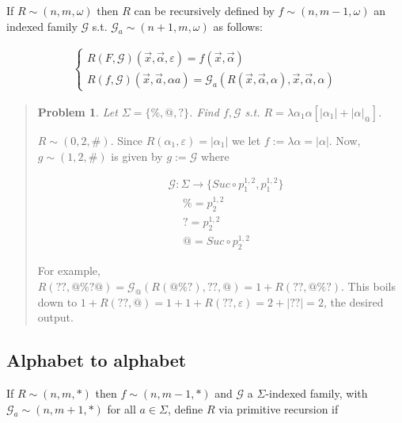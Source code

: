 \documentclass[a4paper, 12pt]{article}
\newtheorem{problem}{Problem}
\newtheorem{problem}{Problem}
\begin{document}
If $R \sim (n, m, \omega)$ then $R$ can be recursively defined by $f \sim (n, m
- 1, \omega)$ an indexed
family $\mathcal{G}$ s.t. $\mathcal{G}_a \sim (n + 1, m, \omega)$ as follows: 

\begin{align*}
    \begin{cases}
        R(F, \mathcal{G})(\overrightarrow{x}, \overrightarrow{\alpha}, \varepsilon)
        = f(\overrightarrow{x}, \overrightarrow{\alpha}) \\ 
        R(f, \mathcal{G})(\overrightarrow{x}, \overrightarrow{a}, \alpha a) =
        \mathcal{G}_a \left( R(\overrightarrow{x}, \overrightarrow{\alpha},
        \alpha), \overrightarrow{x}, \overrightarrow{\alpha}, \alpha \right) 
    \end{cases}
\end{align*}


\small
\begin{quote}


\begin{problem}
    Let $\Sigma = \{\%, @, ?\}$. Find $f, \mathcal{G}$ s.t. $R = \lambda \alpha_1
    \alpha \left[ |\alpha_1| + |\alpha|_{@} \right] $.
\end{problem}

$R \sim (0, 2, \#)$. Since $R(\alpha_1, \varepsilon) = | \alpha_1|$ we let $f :=
\lambda \alpha = |\alpha|$. Now, $g \sim (1, 2, \#)$ is given by $g :=
\mathcal{G}$ where 

\begin{align*}
    &\mathcal{G} : \Sigma \to \{ Suc \circ p_1^{1, 2}, p_1^{1, 2}  \} \\ 
    &~ ~ ~ ~ ~ ~  \% = p_{2}^{1, 2}\\
    &~ ~ ~ ~ ~ ~  ? = p_{2}^{1, 2}\\
    &~ ~ ~ ~ ~ ~  @ = Suc \circ p_{2}^{1, 2}
\end{align*}

For example, $R(??, @\%?@) = \mathcal{G}_{@} \left( R(@\%?), ??, @ \right) = 1 +
R(??, @\%?) $. This boils down to $1 + R(??, @) = 1 + 1 + R(??, \varepsilon) = 2 +
|??| = 2$, the desired output.

\end{quote}
\normalsize


\subsection{Alphabet to alphabet}

If $R \sim (n, m, *)$ then $f \sim (n, m-1, *)$ and $\mathcal{G}$ a $\Sigma$-indexed
family, with $\mathcal{G}_a \sim (n, m+1, *)$ for all $a\in \Sigma$, define $R$
via primitive recursion if 
\end{document}
